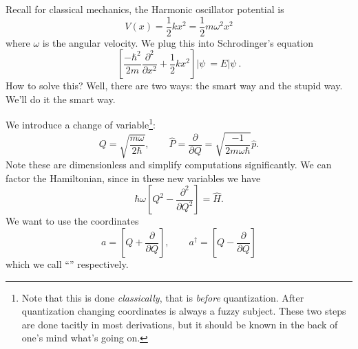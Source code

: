 Recall for classical mechanics, the Harmonic oscillator potential
is
\begin{equation}%
V(x) = \frac{1}{2}kx^2 = \frac{1}{2}m\omega^{2}x^{2}
\end{equation}
where $\omega$ is the angular velocity. We plug this into
Schrodinger's equation
\begin{equation}%
\left[\frac{-\hbar^2}{2m}\frac{\partial^{2}}{\partial x^{2}}+\frac{1}{2}kx^{2}\right]|\psi\>=E|\psi\>.
\end{equation}
How to solve this? Well, there are two ways: the smart way and
the stupid way. We'll do it the smart way.

We introduce a change of variable\footnote{Note that this is done
  \emph{classically}, that is \emph{before} quantization. After
  quantization changing coordinates is always a fuzzy
  subject. These two steps are done tacitly in most derivations,
  but it should be known in the back of one's mind what's going on.}:
\begin{equation}%
Q = \sqrt{\frac{m\omega}{2\hbar}},\qquad
\widehat{P}=\frac{\partial}{\partial Q}=\sqrt{\frac{-1}{2m\omega\hbar}}\widehat{p}.
\end{equation}
Note these are dimensionless and simplify computations
significantly. We can factor the Hamiltonian, since in these new
variables we have
\begin{equation}%
\hbar\omega\left[Q^{2}-\frac{\partial^2}{\partial Q^2}\right] = \widehat{H}.
\end{equation}
We want to use the coordinates
\begin{equation}%
a=\left[Q+\frac{\partial}{\partial Q}\right],\qquad a^{\dag}=\left[Q-\frac{\partial}{\partial Q}\right]
\end{equation}
which we call ``''
respectively.

